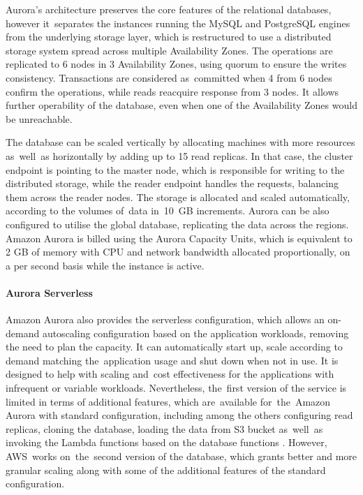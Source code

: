 Aurora’s architecture preserves the core features of the relational databases, however it~separates the instances running the MySQL and PostgreSQL engines from the underlying storage layer, which is restructured to use a distributed storage system spread across multiple Availability Zones.
The operations are replicated to 6 nodes in 3 Availability Zones, using quorum to ensure the writes consistency.
Transactions are considered as~committed when 4 from 6 nodes confirm the operations, while reads reacquire response from 3 nodes. 
It allows further operability of the database, even when one of the Availability Zones would be unreachable.

The database can be scaled vertically by allocating machines with more resources as~well~as horizontally by adding up to 15 read replicas.
In that case, the cluster endpoint is pointing to the master node, which is responsible for writing to the distributed storage, while the reader endpoint handles the requests, balancing them across the reader nodes.
The storage is allocated and scaled automatically, according to the volumes of~data in~10~GB increments.
Aurora can be also configured to utilise the global database, replicating the data across the regions.
Amazon Aurora is billed using the Aurora Capacity Units, which is equivalent to 2 GB of memory with CPU and network bandwidth allocated proportionally, on a per second basis while the instance is active.

\paragraph{Aurora Serverless}

Amazon Aurora also provides the serverless configuration, which allows an on-demand autoscaling configuration based on the application workloads, removing the need to plan the capacity.
It can automatically start up, scale according to demand matching the~application usage and shut down when not in use.
It is designed to help with scaling and~cost effectiveness for the applications with infrequent or variable workloads.
Nevertheless, the~first version of the service is limited in terms of additional features, which are~available for~the~Amazon Aurora with standard configuration, including among the others configuring read replicas, cloning the database, loading the data from S3 bucket as~well~as invoking the Lambda functions based on the database functions \cite{AuroraServerless}.
However, AWS~works on~the~second version of the database, which grants better and more granular scaling along with some of the additional features of the standard configuration.

